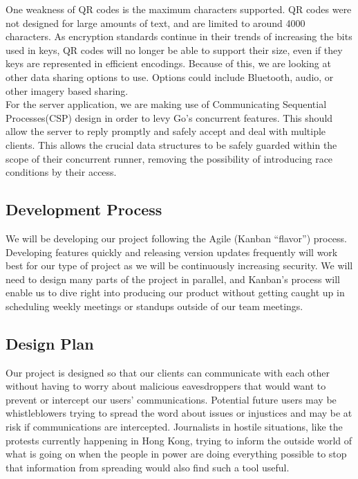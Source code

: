 \documentclass[11pt]{article}
\begin{document}
One weakness of QR codes is the maximum characters supported. QR codes were not designed for large amounts of text, and are limited to around 4000 characters. As encryption standards continue in their trends of increasing the bits used in keys, QR codes will no longer be able to support their size, even if they keys are represented in efficient encodings. Because of this, we are looking at other data sharing options to use. Options could include Bluetooth, audio, or other imagery based sharing.\\

For the server application, we are making use of Communicating Sequential Processes(CSP) design in order to levy Go’s concurrent features. This should allow the server to reply promptly and safely accept and deal with multiple clients. This allows the crucial data structures to be safely guarded within the scope of their concurrent runner, removing the possibility of introducing race conditions by their access.

\subsection{Development Process}
We will be developing our project following the Agile (Kanban “flavor”) process. Developing features quickly and releasing version updates frequently will work best for our type of project as we will be continuously increasing security. We will need to design many parts of the project in parallel, and Kanban’s process will enable us to dive right into producing our product without getting caught up in scheduling weekly meetings or standups outside of our team meetings.


\subsection{Design Plan}
Our project is designed so that our clients can communicate with each other without having to worry about malicious eavesdroppers that would want to prevent or intercept our users’ communications. Potential future users may be whistleblowers trying to spread the word about issues or injustices and may be at risk if communications are intercepted. Journalists in hostile situations, like the protests currently happening in Hong Kong, trying to inform the outside world of what is going on when the people in power are doing everything possible to stop that information from spreading would also find such a tool useful. \\
\end{document}
